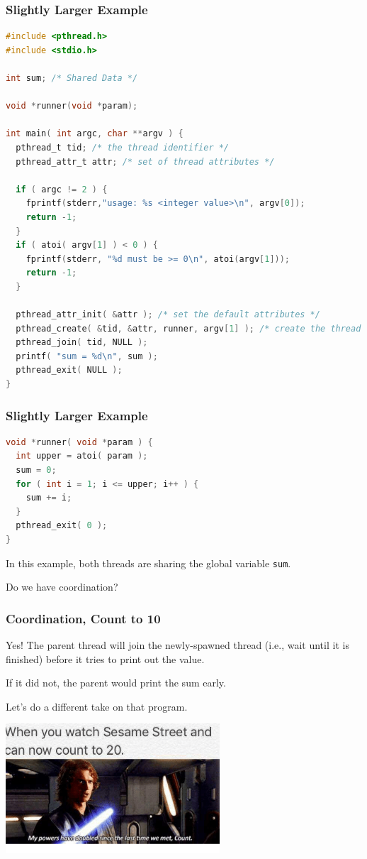 \begin{frame}[fragile]
	\frametitle{Slightly Larger Example}

	\begin{lstlisting}[language=C]
#include <pthread.h>
#include <stdio.h>

int sum; /* Shared Data */

void *runner(void *param);

int main( int argc, char **argv ) {
  pthread_t tid; /* the thread identifier */
  pthread_attr_t attr; /* set of thread attributes */

  if ( argc != 2 ) {
    fprintf(stderr,"usage: %s <integer value>\n", argv[0]); 
    return -1;
  }
  if ( atoi( argv[1] ) < 0 ) {
    fprintf(stderr, "%d must be >= 0\n", atoi(argv[1])); 
    return -1;
  }

  pthread_attr_init( &attr ); /* set the default attributes */
  pthread_create( &tid, &attr, runner, argv[1] ); /* create the thread */
  pthread_join( tid, NULL ); 
  printf( "sum = %d\n", sum );
  pthread_exit( NULL );
}
\end{lstlisting}


\end{frame}

\begin{frame}[fragile]
	\frametitle{Slightly Larger Example}


	\begin{lstlisting}[language=C]
void *runner( void *param ) {
  int upper = atoi( param );
  sum = 0;
  for ( int i = 1; i <= upper; i++ ) {
    sum += i;
  }
  pthread_exit( 0 );
}
\end{lstlisting}

	In this example, both threads are sharing the global variable \texttt{sum}.

	Do we have coordination?

\end{frame}


\begin{frame}
	\frametitle{Coordination, Count to 10}
	Yes! The parent thread will join the newly-spawned thread (i.e., wait until it is finished) before it tries to print out the value.

	If it did not, the parent would print the sum early.

	Let's do a different take on that program.

	\begin{center}
		\includegraphics[width=0.6\textwidth]{images/sesamestreet.png}
	\end{center}

\end{frame}

